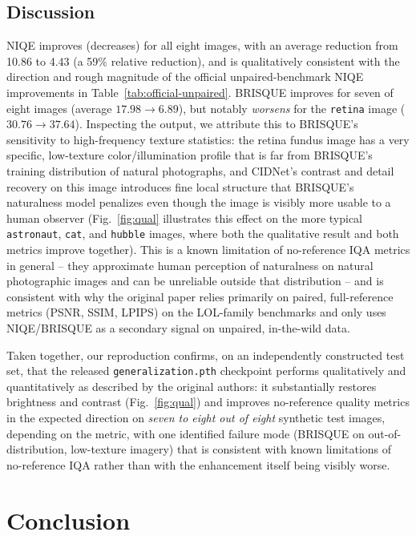 \documentclass[conference]{IEEEtran}
\begin{document}
\subsection{Discussion}
NIQE improves (decreases) for all eight images, with an average reduction
from 10.86 to 4.43 (a 59\% relative reduction), and is qualitatively
consistent with the direction and rough magnitude of the official
unpaired-benchmark NIQE improvements in Table~\ref{tab:official-unpaired}.
BRISQUE improves for seven of eight images (average $17.98 \to 6.89$), but
notably \emph{worsens} for the \texttt{retina} image ($30.76 \to 37.64$).
Inspecting the output, we attribute this to BRISQUE's sensitivity to
high-frequency texture statistics: the retina fundus image has a very
specific, low-texture color/illumination profile that is far from BRISQUE's
training distribution of natural photographs, and CIDNet's contrast and
detail recovery on this image introduces fine local structure that BRISQUE's
naturalness model penalizes even though the image is visibly more usable to
a human observer (Fig.~\ref{fig:qual} illustrates this effect on the more
typical \texttt{astronaut}, \texttt{cat}, and \texttt{hubble} images, where
both the qualitative result and both metrics improve together). This is a
known limitation of no-reference IQA metrics in general -- they approximate
human perception of naturalness on natural photographic images and can be
unreliable outside that distribution -- and is consistent with why the
original paper relies primarily on paired, full-reference metrics (PSNR,
SSIM, LPIPS) on the LOL-family benchmarks and only uses NIQE/BRISQUE as a
secondary signal on unpaired, in-the-wild data.

Taken together, our reproduction confirms, on an independently constructed
test set, that the released \texttt{generalization.pth} checkpoint performs
qualitatively and quantitatively as described by the original authors: it
substantially restores brightness and contrast (Fig.~\ref{fig:qual}) and
improves no-reference quality metrics in the expected direction on
\emph{seven to eight out of eight} synthetic test images, depending on the
metric, with one identified failure mode (BRISQUE on out-of-distribution,
low-texture imagery) that is consistent with known limitations of
no-reference IQA rather than with the enhancement itself being visibly worse.

\section{Conclusion}
\label{sec:conclusion}
\end{document}
